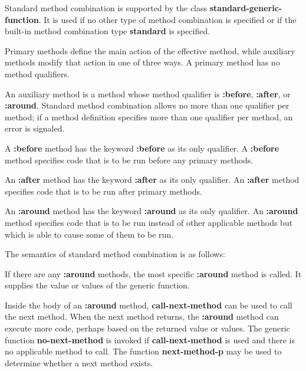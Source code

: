 \endsubSection%


Standard method combination is supported by the class {\bf
standard-generic-function}. It is used if no other type of method
combination is specified or if the built-in method combination type
{\bf standard} is specified. 

{\bit Primary methods\/} define the main action of the effective method,  
while {\bit auxiliary methods\/} modify that action in one of three ways.
A primary method has no method qualifiers.

An auxiliary method is a method whose method qualifier is {\bf
:before}, {\bf :after}, or {\bf :around}.  Standard method combination
allows no more than one qualifier per method; if a method definition
specifies more than one qualifier per method, an error is signaled.

\beginlist

\item{\bull}
A {\bf :before} method has the keyword {\bf :before} as its
only qualifier.  A {\bf :before} method specifies code that is to be
run before any primary methods.

\item{\bull}
An {\bf :after} method has the keyword {\bf :after} as its only
qualifier.  An {\bf :after} method specifies code that is to be run
after primary methods.  

\item{\bull}
An {\bf :around} method has the keyword {\bf :around} as its only
qualifier. An {\bf :around} method specifies code that is to
be run instead of other applicable methods but which is
able to cause some of them to be run.

\endlist

\newpage

The semantics of standard method combination is as follows:

\beginlist

\item{\bull} If there are any {\bf :around} methods, the most specific
{\bf :around} method is called.  It supplies the value or values of the
generic function.

\item{\bull} Inside the body of an {\bf :around} method, {\bf
call-next-method} can be used to call the next method.  When the next
method returns, the {\bf :around} method can execute more code,
perhaps based on the returned value or values.  The generic function
{\bf no-next-method} is invoked if {\bf call-next-method} is used and
there is no applicable method to call.  The function {\bf
next-method-p} may be used to determine whether a next method exists.

